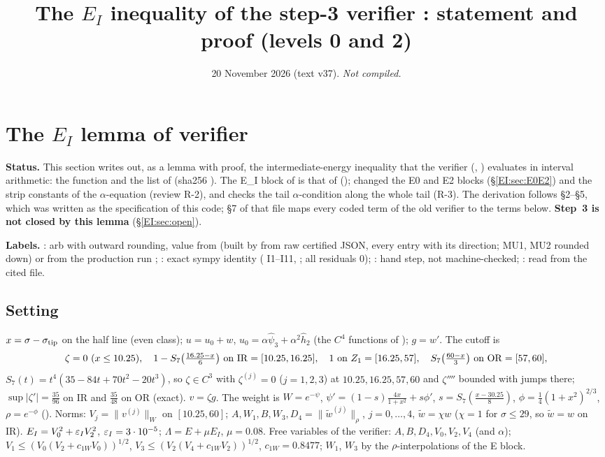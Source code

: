 \documentclass[11pt]{article}
\title{The $E_I$ inequality of the step-3 verifier \fn{fin13v4b}: statement and proof (levels 0 and 2)}
\author{}\date{20 November 2026 (text v37). \emph{Not compiled.}}
\begin{document}
\maketitle
\fi
\providecommand{\Dv}{\mathcal D_V}

\section{The $E_I$ lemma of verifier }\label{EI:sec}
\noindent\textbf{Status.} This section writes out, as a lemma with proof, the intermediate-energy inequality that the verifier  (, ) evaluates in interval arithmetic: the function  and the list  of  (sha256 ). The E\_I block of  is that of  ();  changed the E0 and E2 blocks (\S\ref{EI:sec:E0E2}) and the strip constants of the $\alpha$-equation (review R-2), and checks the tail $\alpha$-condition along the whole tail (R-3). The derivation follows  \S2--\S5, which was written as the specification of this code; \S7 of that file maps every coded term of the old verifier  to the terms below. \textbf{Step~3 is not closed by this lemma} (\S\ref{EI:sec:open}).

\noindent\textbf{Labels.} \tC: arb with outward rounding, value from  (built by  from raw certified JSON, every entry with its direction; MU1, MU2 rounded down) or from the production run ; \tS: exact sympy identity ( I1--I11, ; all residuals 0); \tHd: hand step, not machine-checked; \tR: read from the cited file.

\subsection{Setting}\label{EI:sec:set}
$x=\sigma-\sigma_{\rm tip}$ on the half line (even class); $u=u_0+w$, $u_0=\alpha\hat\psi_3+\alpha^2\hat h_2$ (the $C^4$ functions of ); $g=w'$. The cutoff is
\[
\zeta=0\ (x\le10.25),\quad 1-S_7\bigl(\tfrac{16.25-x}{6}\bigr)\ \text{on }\mathrm{IR}=[10.25,16.25],\quad 1\ \text{on }Z_1=[16.25,57],\quad S_7\bigl(\tfrac{60-x}3\bigr)\ \text{on }\mathrm{OR}=[57,60],
\]
$S_7(t)=t^4(35-84t+70t^2-20t^3)$, so $\zeta\in C^3$ with $\zeta^{(j)}=0$ ($j=1,2,3$) at $10.25,16.25,57,60$ and $\zeta''''$ bounded with jumps there; $\sup|\zeta'|=\frac{35}{96}$ on IR and $\frac{35}{48}$ on OR (exact). $v=\zeta g$. The weight is $W=e^{-\psi}$, $\psi'=(1-s)\frac{4x}{1+x^2}+s\phi'$, $s=S_7(\frac{x-30.25}8)$, $\phi=\frac14(1+x^2)^{2/3}$, $\rho=e^{-\phi}$ (). Norms: $V_j=\|v^{(j)}\|_W$ on $[10.25,60]$; $A,W_1,B,W_3,D_4=\|\tilde w^{(j)}\|_\rho$, $j=0,\dots,4$, $\tilde w=\chi w$ ($\chi=1$ for $\sigma\le29$, so $\tilde w=w$ on IR). $E_I=V_0^2+\varepsilon_I V_2^2$, $\varepsilon_I=3\cdot10^{-5}$; $\Lambda=E+\mu E_I$, $\mu=0.08$. Free variables of the verifier: $A,B,D_4,V_0,V_2,V_4$ (and $\alpha$); $V_1\le(V_0(V_2+c_{1W}V_0))^{1/2}$, $V_3\le(V_2(V_4+c_{1W}V_2))^{1/2}$, $c_{1W}=0.8477$; $W_1$, $W_3$ by the $\rho$-interpolations of the E block.
\end{document}

